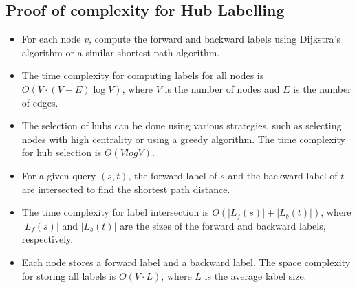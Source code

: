 \begin{appendices}
\section{Proof of complexity for Hub Labelling}\label{appendix:Hub Labelling:Complexity}
	\begin{itemize}
		\item For each node $v$, compute the forward and backward labels using Dijkstra's algorithm or a similar shortest path algorithm.
		\item The time complexity for computing labels for all nodes is $O(V \cdot (V+E)\log V)$, where $V$ is the number of nodes and $E$ is the number of edges.
		\item The selection of hubs can be done using various strategies, such as selecting nodes with high centrality or using a greedy algorithm. The time complexity for hub selection is $O(VlogV)$.
		\item For a given query $(s,t)$, the forward label of $s$ and the backward label of $t$ are intersected to find the shortest path distance.
		\item The time complexity for label intersection is $O(|L_f(s)| + |L_b(t)|)$, where $|L_f(s)|$ and $|L_b(t)|$ are the sizes of the forward and backward labels, respectively.
		\item Each node stores a forward label and a backward label. The space complexity for storing all labels is $O(V \cdot L)$, where $L$ is the average label size.
	\end{itemize}
	
\end{appendices}